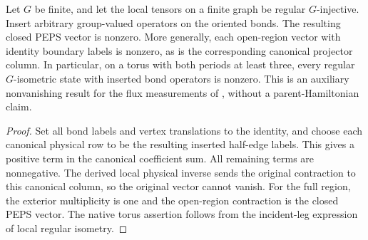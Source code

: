 \begin{lemma}
    \label{thm:peps_regular_twisted_state_nonzero}
    \leanok
    Let $G$ be finite, and let the local tensors on a finite graph be
    regular $G$-injective. Insert arbitrary group-valued operators on
    the oriented bonds. The resulting closed PEPS vector is nonzero.
    More generally, each open-region vector with identity boundary
    labels is nonzero, as is the corresponding canonical projector column.
    In particular, on a torus with both periods at least three, every
    regular $G$-isometric state with inserted bond operators is nonzero.
    This is an auxiliary nonvanishing result for the flux measurements
    of \cite[Theorem~6.15]{Schuch2010PEPS}, without a parent-Hamiltonian claim.
\end{lemma}
\begin{proof}\leanok
    Set all bond labels and vertex translations to the identity, and
    choose each canonical physical row to be the resulting inserted
    half-edge labels. This gives a positive term in the
    canonical coefficient sum. All remaining terms are nonnegative.
    The derived local physical inverse sends the original contraction
    to this canonical column, so the original vector cannot vanish.
    For the full region, the exterior multiplicity is one and the
    open-region contraction is the closed PEPS vector. The native
    torus assertion follows from the incident-leg expression of local
    regular isometry.
\end{proof}
